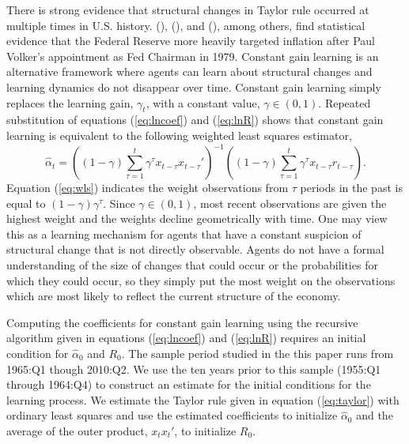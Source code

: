 \documentclass[12pt]{article}
\newcommand{\beq}{\begin{equation}}
\newcommand{\eeq}{\end{equation}}
\newcommand{\citee}[1]{\citename{#1} (\citeyear{#1})}
\begin{document}
There is strong evidence that structural changes in Taylor rule occurred at multiple times in U.S. history.  \citee{taylor1999}, \citee{cgg2000}, and \citee{orphanides2003}, among others, find statistical evidence that the Federal Reserve more heavily targeted inflation after Paul Volker's appointment as Fed Chairman in 1979.  Constant gain learning is an alternative framework where agents can learn about structural changes and learning dynamics do not disappear over time.  Constant gain learning simply replaces the learning gain, $\gamma_t$, with a constant value, $\gamma \in (0,1)$.  Repeated substitution of equations (\ref{eq:lncoef}) and (\ref{eq:lnR}) shows that constant gain learning is equivalent to the following weighted least squares estimator,
\beq \label{eq:wls} \hat{\alpha}_t = \left( (1-\gamma)  \sum_{\tau=1}^{t} \gamma^{\tau} x_{t-\tau} x_{t-\tau}' \right)^{-1}  \left( (1-\gamma)  \sum_{\tau=1}^{t} \gamma^{\tau} x_{t-\tau}  r_{t-\tau} \right). \eeq
Equation (\ref{eq:wls}) indicates the weight observations from $\tau$ periods in the past is equal to $(1-\gamma)\gamma^{\tau}$.  Since $\gamma \in (0,1)$, most recent observations are given the highest weight and the weights decline geometrically with time.  One may view this as a learning mechanism for agents that have a constant suspicion of structural change that is not directly observable.  Agents do not have a formal understanding of the size of changes that could occur or the probabilities for which they could occur, so they simply put the most weight on the observations which are most likely to reflect the current structure of the economy.

Computing the coefficients for constant gain learning using the recursive algorithm given in equations (\ref{eq:lncoef}) and (\ref{eq:lnR}) requires an initial condition for $\hat{\alpha}_0$ and $R_0$.  The sample period studied in the this paper runs from 1965:Q1 though 2010:Q2.  We use the ten years prior to this sample (1955:Q1 through 1964:Q4) to construct an estimate for the initial conditions for the learning process.  We estimate the Taylor rule given in equation (\ref{eq:taylor}) with ordinary least squares and use the estimated coefficients to initialize $\hat{\alpha}_0$ and the average of the outer product, $x_t x_t'$, to initialize $R_0$.
\end{document}
